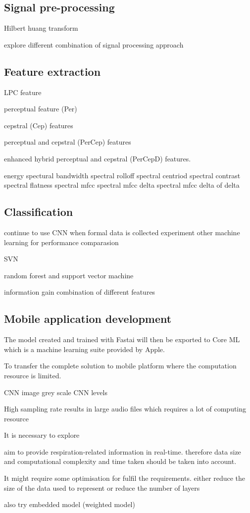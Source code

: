 \subsection{Signal pre-processing}

Hilbert huang transform

explore different combination of signal processing approach

\subsection{Feature extraction}
LPC feature

perceptual feature (Per)

cepstral (Cep) features

perceptual and cepstral (PerCep) features 

enhanced hybrid perceptual and cepstral (PerCepD) features.

energy
spectural bandwidth
spectral rolloff
spectral centriod
spectral contrast
spectral flatness
spectral mfcc
spectral mfcc delta
spectral mfcc delta of delta

\subsection{Classification}
continue to use CNN when formal data is collected
experiment other machine learning for performance comparasion

SVN

random forest and support vector machine

information gain
combination of different features


\subsection{Mobile application development}

The model created and trained with Fastai will then be exported to Core ML which is a machine learning suite provided by Apple.

To transfer the complete solution to mobile platform where the computation resource is limited. 

CNN image grey scale
CNN levels

High sampling rate results in large audio files which requires a lot of computing resource 


It is necessary to explore 

aim to provide respiration-related information in real-time. therefore data size and computational complexity and time taken should be taken into account.

It might require some optimisation for fulfil the requirements. either reduce the size of the data used to represent or reduce the number of layers

also try embedded model (weighted model)